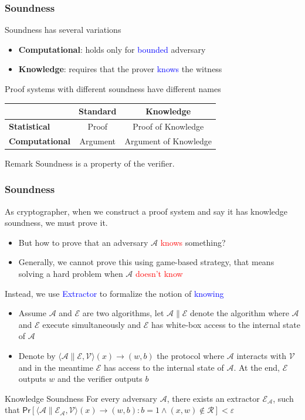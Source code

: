\documentclass{beamer}
\newcommand{\blue}[1]{\textcolor{blue}{#1}}
\newcommand{\dgreen}[1]{\textcolor{dgreen}{#1}}
\newcommand{\red}[1]{\textcolor{red}{#1}}
\begin{document}
\frame
{
  \frametitle{Soundness}
  \onslide<+-> Soundness has several variations
  \begin{itemize}
    \item<+-> \textbf{Computational}: holds only for \blue{bounded} adversary
    \item<+-> \textbf{Knowledge}: requires that the prover \blue{knows} the witness
  \end{itemize}
  \onslide<+->Proof systems with different soundness have different names
  \onslide<+->\begin{table}[tb]
    \centering

    \begin{tabular}{l|cc}
    \hline

    \hline
     & \textbf{Standard} & \textbf{Knowledge} \\
    \hline
      \textbf{Statistical}   & Proof & Proof of Knowledge \\
      \textbf{Computational} & Argument & Argument of Knowledge \\
    \hline

    \hline
    \end{tabular}
  \end{table}

  \onslide<+->\begin{block}{Remark}
  Soundness is a property of the verifier.
  \end{block}
}

\frame
{
  \frametitle{Soundness}
  \onslide<+->As cryptographer, when we construct a proof system and say it has knowledge soundness, we must prove it.
  \begin{itemize}
    \item<+->But how to prove that an adversary $\mathcal{A}$ \red{knows} something?
    \item<+->Generally, we cannot prove this using game-based strategy, that means solving a hard problem when $\mathcal{A}$ \red{doesn't know}
  \end{itemize}
  \onslide<+->Instead, we use \blue{Extractor} to formalize the notion of \blue{knowing}
  \begin{itemize}
    \item<+-> Assume $\mathcal{A}$ and $\mathcal{E}$ are two algorithms, let $\mathcal{A}\|\mathcal{E}$ denote the algorithm where $\mathcal{A}$ and $\mathcal{E}$ execute simultaneously and $\mathcal{E}$ has \dgreen{white-box} access to the internal state of $\mathcal{A}$
    \item<+-> Denote by $\langle\mathcal{A}\|\mathcal{E},\mathcal{V}\rangle(x)\to(w,b)$ the protocol where $\mathcal{A}$ interacts with $\mathcal{V}$ and in the meantime $\mathcal{E}$ has access to the internal state of $\mathcal{A}$. At the end, $\mathcal{E}$ outputs $w$ and the verifier outputs $b$
  \end{itemize}
  \onslide<+->\begin{block}{Knowledge Soundness}
  For every adversary $\mathcal{A}$, there exists an extractor $\mathcal{E}_{\mathcal{A}}$, such that $\mathsf{Pr}[\langle\mathcal{A}\|\mathcal{E}_{\mathcal{A}},\mathcal{V}\rangle(x)\to(w,b):b=1\wedge (x,w)\notin\mathcal{R}]<\varepsilon$
  \end{block}
}
\end{document}
